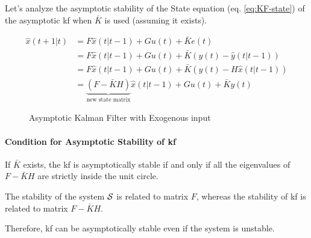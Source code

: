 Let's analyze the asymptotic stability of the State equation (eq. \ref{eq:KF-state}) of the asymptotic \gls{kf} when $\bar{K}$ is used (assuming it exists).

\begin{align*}
    \hat{x}(t+1|t) &= F\hat{x}(t|t-1) + Gu(t) + \bar{K}e(t) \\
    &= F\hat{x}(t|t-1) + Gu(t) + \bar{K}(y(t) - \hat{y}(t|t-1)) \\
    &= F\hat{x}(t|t-1) + Gu(t) + \bar{K}(y(t) - H\hat{x}(t|t-1)) \\
    &= \underbrace{(F - \bar{K}H)}_{\text{new state matrix}} \hat{x}(t|t-1) + Gu(t) + \bar{K}y(t)
\end{align*}

\begin{figure}[H]
    \centering
    \caption*{Asymptotic Kalman Filter with Exogenous input}
\end{figure}

\paragraph{Condition for Asymptotic Stability of \gls{kf}}

 If $\bar{K}$ exists, the \gls{kf} is asymptotically stable if and only if all the eigenvalues of $F-\bar{K}H$ are strictly inside the unit circle.

\begin{obs}
    The stability of the system $\mathcal{S}$ is related to matrix $F$, whereas the stability of \gls{kf} is related to matrix $F-\bar{K}H$.

    Therefore, \gls{kf} can be asymptotically stable even if the system is unstable.
\end{obs}

